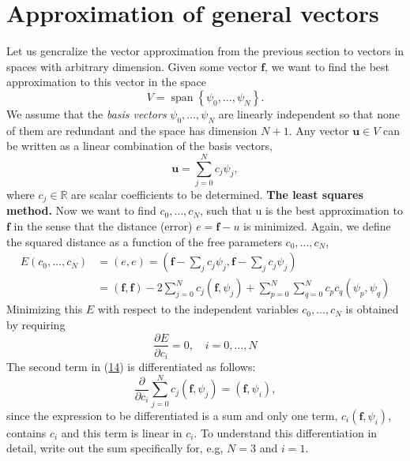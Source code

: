 \documentclass[../main.tex]{subfiles}
\begin{document}
	\section[Approximation of general vectors]{Approximation of general vectors}
	\label{sec:sec_1_2}
	\noindent Let us gencralize the vector approximation from the previous section to vectors in spaces with arbitrary dimension. Given some vector $\boldsymbol{f}$, we want to find the best approximation to this vector in the space
	$$
	V=\operatorname{span}\left\{\psi_{0}, \ldots, \psi_{N}\right\}.
	$$
	We assume that the \textit{basis vectors} $\psi_{0}, \ldots, \psi_{N}$ are linearly independent so that none of them are redundant and the space has dimension $N+1$. Any vector $\boldsymbol{u} \in V$ can be written as a linear combination of the basis vectors,
	$$
	\boldsymbol{u}=\sum_{j=0}^{N} c_{j} \psi_{j},
	$$
	where $c_{j} \in \mathbb{R}$ are scalar coefficients to be determined.
	\bigbreak
	\noindent \textbf{The least squares method.} Now we want to find $c_{0}, \ldots, c_{N}$, such that u is the best approximation to $\boldsymbol{f}$ in the sense that the distance (error) $e=\boldsymbol{f}-u$ is minimized. Again, we define the squared distance as a function of the free parameters $c_{0}, \ldots, c_{N}$,
	\begin{equation}\label{eqa14}
		\begin{aligned}
			E\left(c_{0}, \ldots, c_{N}\right) &=(e, e)=\left(\boldsymbol{f}-\sum_{j} c_{j} \psi_{j}, \boldsymbol{f}-\sum_{j} c_{j} \psi_{j}\right) \\
			&=(\boldsymbol{f}, \boldsymbol{f})-2 \sum_{j=0}^{N} c_{j}\left(\boldsymbol{f}, \psi_{j}\right)+\sum_{p=0}^{N} \sum_{q=0}^{N} c_{p} c_{q}\left(\psi_{p}, \psi_{q}\right)
		\end{aligned}
	\end{equation}
	Minimizing this $E$ with respect to the independent variables $c_{0}, \ldots, c_{N}$ is obtained by requiring
	$$
	\frac{\partial E}{\partial c_{i}}=0, \quad i=0, \ldots, N
	$$
	The second term in (\hyperref[eqa14]{14}) is differentiated as follows:
	\begin{equation}\label{eqa15}
		\frac{\partial}{\partial c_{i}} \sum_{j=0}^{N} c_{j}\left(\boldsymbol{f}, \psi_{j}\right)=\left(\boldsymbol{f}, \psi_{i}\right),
	\end{equation}
	since the expression to be differentiated is a sum and only one term, $c_{i}\left(\boldsymbol{f}, \psi_{i}\right)$, contains $c_{i}$ and this term is linear in $c_{i}$. To understand this differentiation in detail, write out the sum specifically for, e.g, $N=3$ and $i=1$.
	
\end{document}
